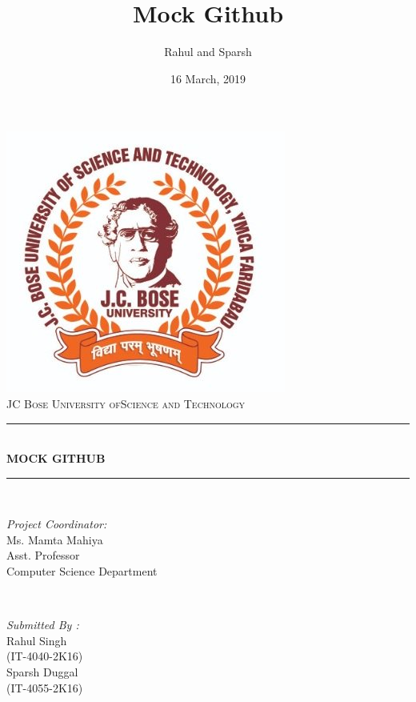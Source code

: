 \documentclass{article}
\title{Mock Github}
\author{Rahul and Sparsh}
\date{16 March, 2019}
\begin{document}
\begin{titlepage}
\centering
    \vspace*{0.5 cm}
    \includegraphics[scale = 0.75]{logo.jpg}\\[0.5 cm]	
    \textsc{\LARGE \hspace{1.0cm} JC Bose University  of\newline\newline Science and Technology}\\[1.5cm]	
	
	\rule{\linewidth}{0.2 mm} \\[0.4 cm]
	\textsc{\LARGE \textbf{ MOCK GITHUB}}
	\rule{\linewidth}{0.2 mm} \\[1.5 cm]
	
	\begin{minipage}{0.4\textwidth}
		\begin{flushleft} \large
			\emph{Project Coordinator:}\\
			Ms. Mamta Mahiya\\
           		Asst. Professor\\
            		Computer Science Department\\
		\end{flushleft}
	\end{minipage}~		
	\begin{minipage}{0.4\textwidth}
           	\begin{flushright} \large
		\emph{Submitted By :} \\
			Rahul Singh\\
            		(IT-4040-2K16)\\
            		Sparsh Duggal\\
            		(IT-4055-2K16)\\
		\end{flushright} 
	\end{minipage}\\[2 cm]
\end{titlepage}
\end{document}
